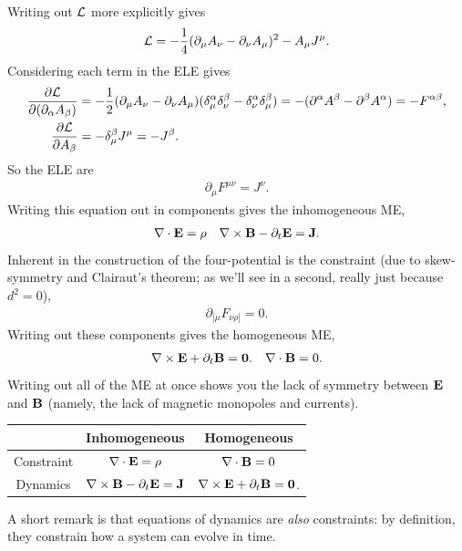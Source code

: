 \documentclass[11pt]{article}
\begin{document}
\begin{dderivation}
    Writing out $\mathcal{L}$ more explicitly gives
    \begin{align*}
        \mathcal{L} = - \frac{1}{4} (\partial_\mu A_\nu - \partial_\nu A_\mu)^2 - A_\mu J^\mu.
    \end{align*}
    Considering each term in the ELE gives
    \begin{align*}
        \frac{\partial \mathcal{L}}{\partial (\partial_\alpha A_\beta)} & = - \frac{1}{2} (\partial_\mu A_\nu - \partial_\nu A_\mu) 
        (\delta^\alpha_\mu \delta^\beta_\nu - \delta^\alpha_\nu \delta^\beta_\mu)
        = - (\partial^\alpha A^\beta - \partial^\beta A^\alpha) = - F^{\alpha \beta},\\
        \frac{\partial \mathcal{L}}{\partial A_\beta} & = - \delta^\beta_\mu J^\mu = - J^\beta.
    \end{align*}
    So the ELE are
    \begin{align*}
        \boxed{\partial_\mu F^{\mu \nu} = J^\nu.}
    \end{align*}
    Writing this equation out in components gives the inhomogeneous ME,
    \begin{align*}
        & \nabla \cdot \mathbf{E} = \rho 
        & \nabla \times \mathbf{B} - \partial_t \mathbf{E} = \mathbf{J}.
    \end{align*}
    Inherent in the construction of the four-potential is the constraint
    (due to skew-symmetry and Clairaut's theorem;
    as we'll see in a second, really just because $d^2 = 0$),
    \begin{align*}
        \partial_{[\mu} F_{\nu \rho]} = 0.
    \end{align*}
    Writing out these components gives the homogeneous ME,
    \begin{align*}
        & \nabla \times \mathbf{E} + \partial_t \mathbf{B} = \mathbf{0}.
        & \nabla \cdot \mathbf{B} = 0.
    \end{align*}
    Writing out all of the ME at once shows you the lack
    of symmetry between $\mathbf{E}$ and $\mathbf{B}$ (namely, the lack of
    magnetic monopoles and currents).
    \begin{table}[H]
        \centering
        \begin{tabular}{|c|c|c|}
            \hline
            & Inhomogeneous & Homogeneous\\
            \hline
            Constraint & $\nabla \cdot \mathbf{E} = \rho$ & $\nabla \cdot \mathbf{B} = 0$\\
            Dynamics & $\nabla \times \mathbf{B} - \partial_t \mathbf{E} = \mathbf{J}$ & $\nabla \times \mathbf{E} + \partial_t \mathbf{B} = \mathbf{0}$.\\
            \hline
        \end{tabular}
    \end{table}
    \noin
    A short remark is that equations of dynamics are \emph{also}
    constraints: by definition, they constrain how a system can evolve in time.\\


\end{dderivation}
\end{document}
